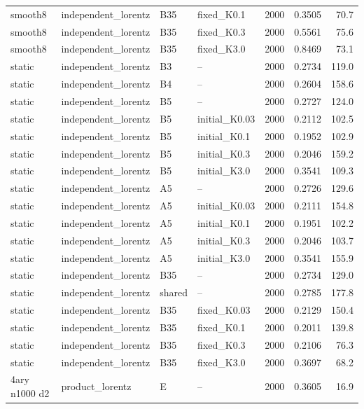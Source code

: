 \begin{longtable}{llllrrr}
smooth8 & independent\_lorentz & B35 & fixed\_K0.1 & 2000 & 0.3505 & 70.7 \\
smooth8 & independent\_lorentz & B35 & fixed\_K0.3 & 2000 & 0.5561 & 75.6 \\
smooth8 & independent\_lorentz & B35 & fixed\_K3.0 & 2000 & 0.8469 & 73.1 \\
static & independent\_lorentz & B3 & -- & 2000 & 0.2734 & 119.0 \\
static & independent\_lorentz & B4 & -- & 2000 & 0.2604 & 158.6 \\
\rowcolor{oursbg}
static & independent\_lorentz & B5 & -- & 2000 & 0.2727 & 124.0 \\
\rowcolor{oursbg}
static & independent\_lorentz & B5 & initial\_K0.03 & 2000 & 0.2112 & 102.5 \\
\rowcolor{oursbg}
static & independent\_lorentz & B5 & initial\_K0.1 & 2000 & 0.1952 & 102.9 \\
\rowcolor{oursbg}
static & independent\_lorentz & B5 & initial\_K0.3 & 2000 & 0.2046 & 159.2 \\
\rowcolor{oursbg}
static & independent\_lorentz & B5 & initial\_K3.0 & 2000 & 0.3541 & 109.3 \\
static & independent\_lorentz & A5 & -- & 2000 & 0.2726 & 129.6 \\
static & independent\_lorentz & A5 & initial\_K0.03 & 2000 & 0.2111 & 154.8 \\
static & independent\_lorentz & A5 & initial\_K0.1 & 2000 & 0.1951 & 102.2 \\
static & independent\_lorentz & A5 & initial\_K0.3 & 2000 & 0.2046 & 103.7 \\
static & independent\_lorentz & A5 & initial\_K3.0 & 2000 & 0.3541 & 155.9 \\
static & independent\_lorentz & B35 & -- & 2000 & 0.2734 & 129.0 \\
static & independent\_lorentz & shared & -- & 2000 & 0.2785 & 177.8 \\
static & independent\_lorentz & B35 & fixed\_K0.03 & 2000 & 0.2129 & 150.4 \\
static & independent\_lorentz & B35 & fixed\_K0.1 & 2000 & 0.2011 & 139.8 \\
static & independent\_lorentz & B35 & fixed\_K0.3 & 2000 & 0.2106 & 76.3 \\
static & independent\_lorentz & B35 & fixed\_K3.0 & 2000 & 0.3697 & 68.2 \\
4ary n1000 d2 & product\_lorentz & E & -- & 2000 & 0.3605 & 16.9 \\

\end{longtable}
